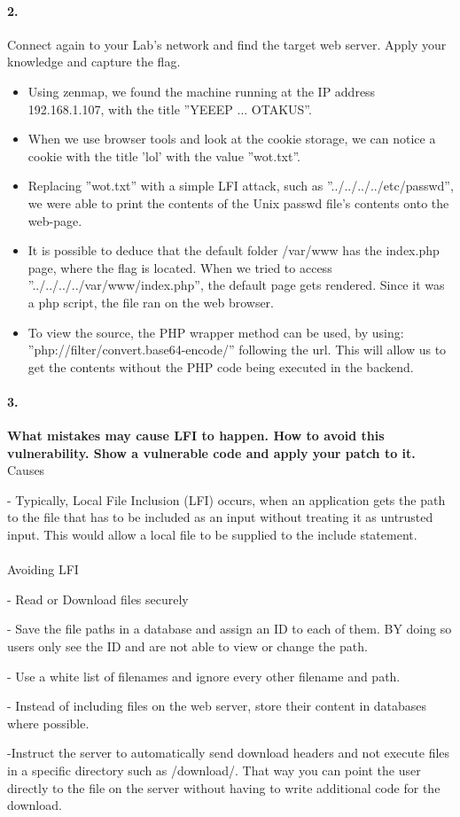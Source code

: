 \documentclass[12pt]{report}
\begin{document}
	\paragraph*{2.}{Connect again to your Lab's network and find the target web server. Apply your knowledge and capture the flag.}
	
	
	\begin{itemize}
		\item Using zenmap, we found the machine running at the IP address 192.168.1.107, with the title ''YEEEP ... OTAKUS''.
		\item When we use browser tools and look at the cookie storage, we can notice a cookie with the title 'lol' with the value ''wot.txt''.
		\item Replacing ''wot.txt'' with a simple LFI attack, such as ''../../../../etc/passwd'', we were able to print the contents of the Unix passwd file's contents onto the web-page.
		\item It is possible to deduce that the default folder /var/www has the index.php page, where the flag is located. When we tried to access ''../../../../var/www/index.php'', the default page gets rendered. Since it was a php script, the file ran on the web browser.
		\item  To view the source, the PHP wrapper method can be used, by using: ''php://filter/convert.base64-encode/'' following the url. This will allow us to get the contents without the PHP code being executed in the backend.
	\end{itemize}
	  
	
	\paragraph*{3.}{\bf What mistakes may cause LFI to happen. How to avoid this vulnerability. Show a vulnerable code and apply your patch to it.}\\
	Causes
	
	- Typically, Local File Inclusion (LFI) occurs, when an application gets the path to the file that has to be included as an input without treating it as untrusted input. This would allow a local file to be supplied to the include statement.\\\\
	Avoiding LFI 
	
	- Read or Download files securely 
	
	- Save the file paths in a database and assign an ID to each of them. BY doing so users only see the ID and are not able to view or change the path.
	
	- Use a white list of filenames and ignore every other filename and path.
	
	- Instead of including files on the web server, store their content in databases where possible.
	
	-Instruct the server to automatically send download headers and not execute files in a specific directory such as /download/. That way you can point the user directly to the file on the server without having to write additional code for the download.
	
	
\end{document}
